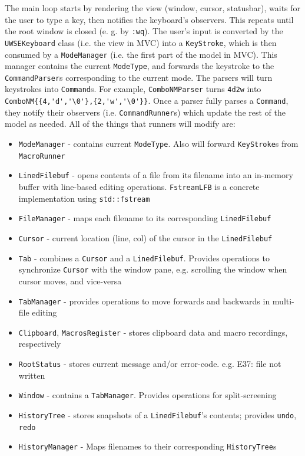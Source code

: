 \documentclass{article}
\newenvironment{myitemize}
{ \begin{itemize}
    \setlength{\itemsep}{2pt}
    \setlength{\parskip}{0pt}
    \setlength{\parsep}{0pt}     }
{ \end{itemize}                  }
\begin{document}
\quad The main loop starts by rendering the view (window, cursor, statusbar), 
waits for the user to type a key, then notifies the keyboard's observers. 
This repeats until the root window is closed (e. g. by \texttt{:wq}).
The user's input is converted by the 
\texttt{UWSEKeyboard} class (i.e. the view in MVC) 
into a \texttt{KeyStroke}, 
which is then consumed by a \texttt{ModeManager} 
(i.e. the first part of the model in MVC).
This manager contains the current \texttt{ModeType}, and forwards the keystroke to 
the \texttt{CommandParser}s corresponding to the current mode. 
The parsers will turn keystrokes into \texttt{Command}s. 
For example, \texttt{ComboNMParser} turns \texttt{4d2w} into 
\verb)ComboNM{{4,'d','\0'},{2,'w','\0'}}). 
Once a parser fully parses a \texttt{Command}, they notify their observers
(i.e. \texttt{CommandRunner}s) which update the rest of the model as needed. 
All of the things that runners will modify are: 
\begin{myitemize}
  \item{\texttt{ModeManager} - contains current \texttt{ModeType}. 
    Also will forward \texttt{KeyStroke}s from \texttt{MacroRunner}}
  \item{\texttt{LinedFilebuf} 
    - opens contents of a file from its filename 
    into an in-memory buffer with line-based editing operations. 
  \texttt{FstreamLFB} is a concrete implementation using \texttt{std::fstream}}
  \item{ \texttt{FileManager} 
    - maps each filename to its corresponding \texttt{LinedFilebuf}}
  \item{ \texttt{Cursor} 
      - current location (line, col) of the cursor in the \texttt{LinedFilebuf} }
  \item{ \texttt{Tab}
    - combines a \texttt{Cursor} and a \texttt{LinedFilebuf}. 
    Provides operations to synchronize \texttt{Cursor} with the window pane, 
  e.g. scrolling the window when cursor moves, and vice-versa}
  \item{ \texttt{TabManager} 
    - provides operations to move forwards and backwards in multi-file editing}
  \item{ \texttt{Clipboard}, \texttt{MacrosRegister} 
    - stores clipboard data and macro recordings, respectively}
  \item{ \texttt{RootStatus} - stores current message and/or error-code. 
    e.g. E37: file not written}
  \item{\texttt{Window} 
    - contains a \texttt{TabManager}. Provides operations for split-screening}
  \item{\texttt{HistoryTree} 
    - stores snapshots of a \texttt{LinedFilebuf}'s contents; 
    provides \texttt{undo}, \texttt{redo}}
  \item{\texttt{HistoryManager} 
    - Maps filenames to their corresponding \texttt{HistoryTree}s}
\end{myitemize}
\end{document}

